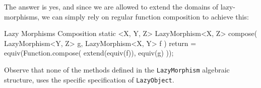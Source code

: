 \documentclass[12pt,a4paper]{report}
\renewcommand{\baselinestretch}{1.5}
\theoremstyle{theorem}
\theoremstyle{definition}
\begin{document}
The answer is yes, and since we are allowed to extend the domains
of lazy-morphisms, we can simply rely on regular function composition
to achieve this:

\renewcommand{\baselinestretch}{1} 
\selectfont

\begin{javacode}{Lazy Morphisms Composition}
static <X, Y, Z> LazyMorphism<X, Z> compose(
  LazyMorphism<Y, Z> g,
  LazyMorphism<X, Y> f
) {
  return = equiv(Function.compose(
    extend(equiv(f)),
    equiv(g)
  ));
}
\end{javacode}

\renewcommand{\baselinestretch}{1.5} 
\selectfont

Observe that none of the methods defined in the
\lstinline{LazyMorphism}{} algebraic structure, uses the specific
specification of \lstinline{LazyObject}{}.
\end{document}
